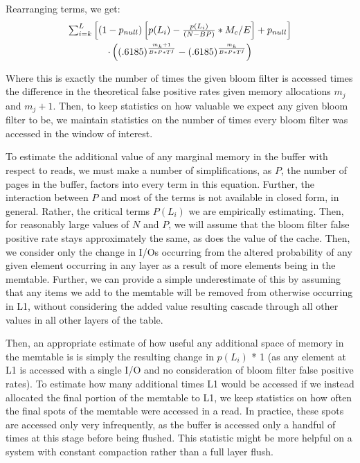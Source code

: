 \documentclass{sig-alternate-05-2015}
\begin{document}
Rearranging terms, we get:
\begin{multline}
$$\sum_{i=k}^{L} \left[(1-p_{null})\left[p(L_i) - \frac{p(L_i)}{(N - BP)} * M_c/E \right] +  p_{null} \right] \\ \cdot \left( (.6185) ^  {\frac{m_k+1}{B*P*T^j}} - (.6185) ^  {\frac{m_k}{B*P*T^j}}\right)$$
\end{multline}

Where this is exactly the number of times the given bloom filter is accessed
times the difference in the theoretical false positive rates given memory
allocations $m_j$ and $m_j+1$. Then, to keep statistics on how valuable we
expect any given bloom filter to be, we maintain statistics on the number of
times every bloom filter was accessed in the window of interest.

To estimate the additional value of any marginal memory in the buffer with
respect to reads, we must make a number of simplifications, as $P$, the number
of pages in the buffer, factors into every term in this equation. Further, the
interaction between $P$ and most of the terms is not available in closed form,
in general. Rather, the critical terms $P(L_i)$ we are empirically estimating.
Then, for reasonably large values of $N$ and $P$, we will assume that the bloom
filter false positive rate stays approximately the same, as does the value of
the cache. Then, we consider only the change in I/Os occurring from the altered
probability of any given element occurring in any layer as a result of more
elements being in the memtable. Further, we can provide a simple underestimate
of this by assuming that any items we add to the memtable will be removed from
otherwise occurring in L1, without considering the added value resulting
cascade through all other values in all other layers of the table.

Then, an appropriate estimate of how useful any additional space of memory in
the memtable is is simply the resulting change in $p(L_i)$ * 1 (as any element
at L1 is accessed with a single I/O and no consideration of bloom filter false
positive rates). To estimate how many additional times L1 would be accessed if
we instead allocated the final portion of the memtable to L1, we keep
statistics on how often the final spots of the memtable were accessed in a
read. In practice, these spots are accessed only very infrequently, as the
buffer is accessed only a handful of times at this stage before being flushed.
This statistic might be more helpful on a system with constant compaction
rather than a full layer flush.
\end{document}
